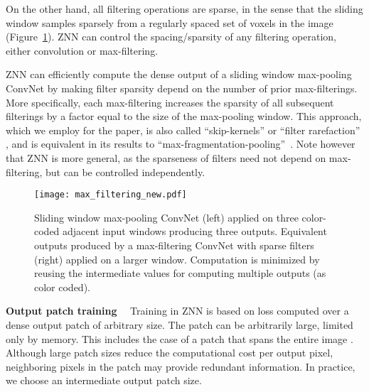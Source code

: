 \documentclass{article} %
\begin{document}
On the other hand, all filtering operations are sparse, in the sense
that the sliding window samples sparsely from a regularly spaced set
of voxels in the image (Figure~\ref{max-filter}).  ZNN can control the spacing/sparsity of any
filtering operation, either convolution or max-filtering.

ZNN can efficiently compute the dense output of a sliding window
max-pooling ConvNet by making filter sparsity depend on the number of
prior max-filterings.  More specifically, each max-filtering increases
the sparsity of all subsequent filterings by a factor equal to the
size of the max-pooling window.  This approach, which we employ for
the paper, is also called ``skip-kernels'' \cite{Sermanet2014} or
``filter rarefaction'' \cite{Long2015}, and is equivalent in its
results to
``max-fragmentation-pooling''~\cite{Giusti2013,Masci2013}. Note
however that ZNN is more general, as the sparseness of filters need
not depend on max-filtering, but can be controlled independently.

\begin{figure}[t]
\begin{center}
\texttt{[image: max\_filtering\_new.pdf]}
\end{center}
\caption{Sliding window max-pooling ConvNet (left) applied on three color-coded adjacent input windows producing three outputs. Equivalent outputs produced by a max-filtering ConvNet with sparse filters (right) applied on a larger window. Computation is minimized by reusing the intermediate values for computing multiple outputs (as color coded).}
\label{max-filter}
\end{figure}

{\bf Output patch training}$\quad$
Training in ZNN is based on loss computed over a dense output patch of
arbitrary size. The patch can be arbitrarily large, limited only by memory.
This includes the case of a patch that spans the
entire image \cite{Long2015, Masci2013}.  Although large patch sizes
reduce the computational cost per output pixel, neighboring pixels in
the patch may provide redundant information.  In practice, we choose
an intermediate output patch size.

\end{document}
